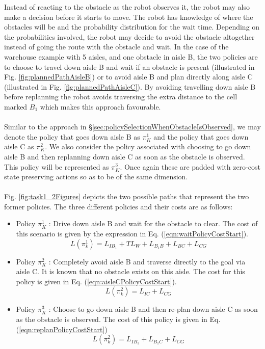\documentclass[a4paper,12pt]{article}
\begin{document}
			Instead of reacting to the obstacle as the robot observes it, the robot may also make a decision before it starts to move. The robot has knowledge of where the obstacles will be and the probability distribution for the wait time. Depending on the probabilities involved, the robot may decide to avoid the obstacle altogether instead of going the route with the obstacle and wait. In the case of the warehouse example with 5 aisles, and one obstacle in aisle B, the two policies are to choose to travel down aisle B and wait if an obstacle is present (illustrated in Fig. \ref{fig:plannedPathAisleB}) or to avoid aisle B and plan directly along aisle C (illustrated in Fig. \ref{fig:plannedPathAisleC}). By avoiding travelling down aisle B before replanning the robot avoids traversing the extra distance to the cell marked $B_1$ which makes this approach favourable.
			\\
			\\
			Similar to the approach in \S \ref{sec:policySelectionWhenObstacleIsObserved}, we may denote the policy that goes down aisle B as $\pi_{K}^{1}$ and the policy that goes down aisle C as $\pi_{K}^{2}$. We also consider the policy associated with choosing to go down aisle B and then replanning down aisle C as soon as the obstacle is observed. This policy will be represented as $\pi_{K}^{3}$. Once again these are padded with zero-cost state preserving actions so as to be of the same dimension. 
			\\
			\\
			Fig. \ref{fig:task1_2Figures} depicts the two possible paths that represent the two former policies. The three different policies and their costs are as follows:
			\begin{itemize}
				\item Policy $\pi_{K}^{1}$ : Drive down aisle B and wait for the obstacle to clear. The cost of this scenario is given by the expression in Eq. (\ref{eqn:waitPolicyCostStart}).
				\begin{equation}
				L(\pi_k^1) = L_{IB_1}+TL_W+L_{B_1B}+L_{BC}+L_{CG}
				\label{eqn:waitPolicyCostStart}
				\end{equation}
				\item Policy $\pi_{K}^{2}$ : Completely avoid aisle B and traverse directly to the goal via aisle C. It is known that no obstacle exists on this aisle. The cost for this policy is given in Eq. (\ref{eqn:aisleCPolicyCostStart}).
				\begin{equation}
				L(\pi_k^2) = L_{IC}+L_{CG}
				\label{eqn:aisleCPolicyCostStart}
				\end{equation}
				\item Policy $\pi_{K}^{3}$ : Choose to go down aisle B and then re-plan down aisle C as soon as the obstacle is observed. The cost of this policy is given in Eq. (\ref{eqn:replanPolicyCostStart})
				\begin{equation}
				L(\pi_k^2) = L_{IB_1}+L_{B_1C}+L_{CG}
				\label{eqn:replanPolicyCostStart}
				\end{equation}
			\end{itemize}
			
\end{document}
